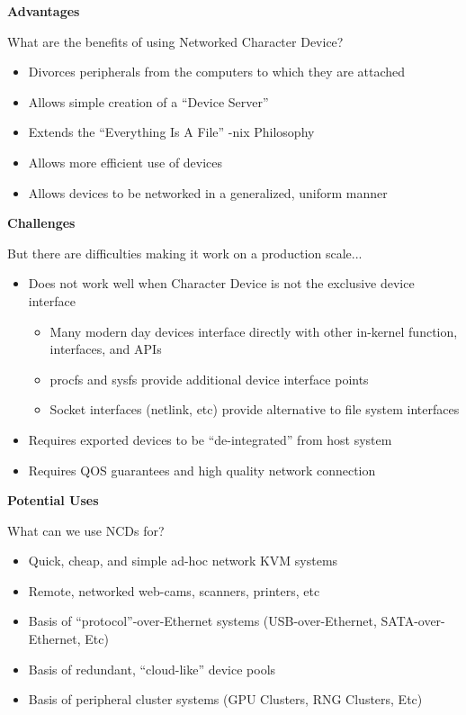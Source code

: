 \documentclass[handout]{beamer}
\begin{document}
\begin{frame}{\bf Advantages}

What are the benefits of using Networked Character Device?

\begin{itemize}
\item<1-> Divorces peripherals from the computers to which they are
  attached
\item<2-> Allows simple creation of a ``Device Server''
\item<3-> Extends the ``Everything Is A File'' -nix Philosophy
\item<4-> Allows more efficient use of devices
\item<5-> Allows devices to be networked in a generalized, uniform manner
\end{itemize}

\end{frame}

\begin{frame}{\bf Challenges}

But there are difficulties making it work on a production scale...

\begin{itemize}
\item<1-> Does not work well when Character Device is not the exclusive
  device interface
  \begin{itemize}
  \item Many modern day devices interface directly with other
    in-kernel function, interfaces, and APIs
  \item procfs and sysfs provide additional device interface points
  \item Socket interfaces (netlink, etc) provide alternative to file
    system interfaces
  \end{itemize}
\item<2-> Requires exported devices to be ``de-integrated'' from host system
\item<3-> Requires QOS guarantees and high quality network connection
\end{itemize}

\end{frame}

\begin{frame}{\bf Potential Uses}

What can we use NCDs for?

\begin{itemize}
\item<1-> Quick, cheap, and simple ad-hoc network KVM systems
\item<2-> Remote, networked web-cams, scanners, printers, etc
\item<3-> Basis of ``protocol''-over-Ethernet systems (USB-over-Ethernet,
  SATA-over-Ethernet, Etc)
\item<4-> Basis of redundant, ``cloud-like'' device pools
\item<5-> Basis of peripheral cluster systems (GPU Clusters, RNG Clusters,
  Etc)
\end{itemize}

\end{frame}
\end{document}
